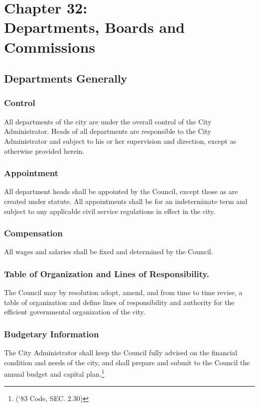 \chapter*{Chapter 32: \\
	Departments, Boards and Commissions}
    \vfill
    \minitoc
    \pagebreak

\section{Departments Generally}
\subsection{Control}
All departments of the city are under the overall control of the City Administrator. Heads of all departments are responsible to the City Administrator and subject to his or her supervision and direction, except as otherwise provided herein.
\subsection{Appointment}
All department heads shall be appointed by the Council, except those as are created under statute. All appointments shall be for an indeterminate term and subject to any applicable civil service regulations in effect in the city.
\subsection{Compensation}
All wages and salaries shall be fixed and determined by the Council.
\subsection{Table of Organization and Lines of Responsibility.}
The Council may by resolution adopt, amend, and from time to time revise, a table of organization and define lines of responsibility and authority for the efficient governmental organization of the city.
\subsection{Budgetary Information}
The City Administrator shall keep the Council fully advised on the financial condition and needs of the city, and shall prepare and submit to the Council the annual budget and capital plan.\footnote{(‘83 Code, SEC. 2.30)}

